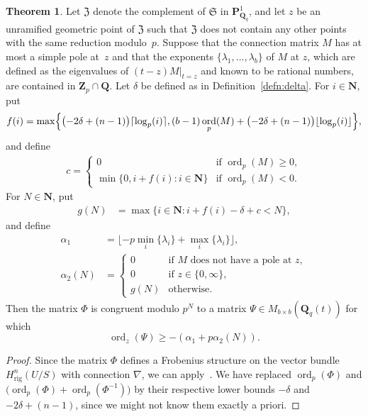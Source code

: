 \documentclass[a4paper,11pt]{article}
\numberwithin{equation}{section}
\newcommand{\NN}{\mathbf{N}} %
\newcommand{\ZZ}{\mathbf{Z}} %
\newcommand{\QQ}{\mathbf{Q}} %
\DeclareMathOperator{\ord}{ord}          %
\providecommand{\Hrig}{H_{\text{rig}}}  %
\theoremstyle{definition}
\newtheorem{thm}{Theorem}[section]
\begin{document}
\begin{thm} \label{thm:KedlayaTuitman}
Let $\mathfrak{Z}$ denote the complement of $\mathfrak{S}$ in 
$\mathbf{P}^{1}_{\mathbf{Q}_q}$, and let $z$ be an unramified geometric point 
of $\mathfrak{Z}$ such that $\mathfrak{Z}$ does not contain any other points 
with the same reduction modulo~$p$. 
Suppose that the connection matrix $M$ has at most a simple pole at~$z$ and that 
the exponents $\{ \lambda_1, \dotsc, \lambda_{b} \}$ of $M$ at $z$, which are defined 
as the eigenvalues of $(t - z) M \vert_{t=z}$ and known to be rational numbers, are 
contained in $\ZZ_p \cap \QQ$. Let $\delta$ be defined as in 
Definition~\ref{defn:delta}. For $i \in \NN$, put
\begin{align*}
f(i) = \max \Bigl\{ \bigl( -2 \delta + (n-1) \bigr) \lceil \log_p(i) \rceil, 
(b-1) \ord_p(M) + \bigl( -2 \delta + (n-1) \bigr) \lfloor \log_p(i) \rfloor 
\Bigr\},
\end{align*}
and define 
\begin{align*}
c = \begin{cases}
0 & \mbox{if $\ord_p(M) \geq 0$}, \\
\min\{0, i + f(i): i \in \NN\} & \mbox{if $\ord_p(M) < 0$}.
\end{cases}
\end{align*}
For $N \in \NN$, put
\begin{align*}
g(N) &= \max \{i \in \NN : i + f(i) - \delta + c  < N \},
\end{align*}
and define
\begin{align*}
\alpha_1    &= \lfloor -p \min_i \{ \lambda_i \} + \max_{i} \{\lambda_i\} \rfloor, \\ 
\alpha_2(N) &=  \left \{ 
         \begin{array}{cl}
         0  & \mbox{if $M$ does not have a pole at $z$},  \\
         0  & \mbox{if $z \in \{0,\infty \}$}, \\
         g(N) & \mbox{otherwise}.
         \end{array}
         \right. 
\end{align*}
Then the matrix $\Phi$ is congruent modulo $p^{N}$ to a matrix 
$\Psi \in M_{b \times b}(\QQ_q(t))$ for which
\begin{equation*}
\ord_z(\Psi) \geq -(\alpha_1+p \alpha_2(N)).
\end{equation*}
\end{thm}

\begin{proof}
Since the matrix $\Phi$ defines a Frobenius structure on the vector 
bundle $\Hrig^n(U/S)$ with connection $\nabla$, we can 
apply~\citep[Theorem~2.1]{KedlayaTuitman2012}. We have 
replaced $\ord_p(\Phi)$ and $ \bigl( \ord_p(\Phi)+\ord_p(\Phi^{-1}) \bigr)$ 
by their respective lower bounds $-\delta$ and $-2 \delta + (n-1)$, since 
we might not know them exactly a priori.
\end{proof}
\end{document}
